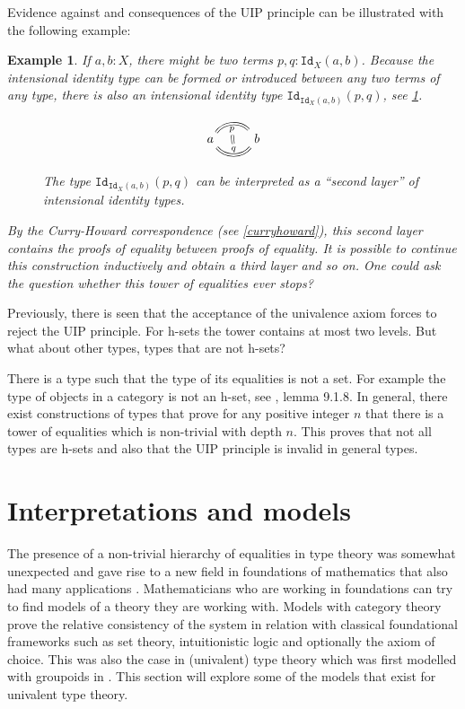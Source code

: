 \documentclass[12pt,a4paper,twoside,xetex]{book}
\newtheorem{example}[theorem]{Example}
\newcommand{\op}[1]{\mathtt{#1}}
\begin{document}
Evidence against and consequences of the UIP principle can be illustrated with 
the following example:

\begin{example}\label{stackedeqs}
If $a,b:X$, there might be two terms $p,q:\op{Id}_X(a,b)$. Because the 
intensional identity type can be formed or introduced between any two terms of 
any type, there is also an intensional identity type 
$\op{Id}_{\op{Id}_X(a,b)}(p,q)$, see \cref{secondleveleq}. 


\begin{figure}\label{secondleveleq}
 \centering
 
\[ \begin{tikzcd}
a \arrow[equal, r, bend left=50, "p"{name=U, below}]
\arrow[equal, r, bend right=50, "q"{name=D}]
& b
\arrow[equal, r, from=U, to=D]
\end{tikzcd}
\]
 \caption{The type $\op{Id}_{\op{Id}_X(a,b)}(p,q)$ can be interpreted as a 
``second layer'' of intensional identity types. }
\end{figure}


By the Curry-Howard correspondence (see \cref{curryhoward}), this second layer 
contains the proofs of equality between proofs of equality. It is possible to 
continue this construction inductively and obtain a third layer and so on. One 
could ask the question whether this tower of equalities ever stops? 
\end{example}




Previously, there is seen that the acceptance of the univalence axiom forces 
to reject the UIP principle. For h-sets the tower contains at most two levels. 
But what about other types, types that are not h-sets? 

There is a type such that the type of its equalities is not a set. For example 
the type of objects in a category is not an h-set, see \cite{Voevodsky2013}, 
lemma 9.1.8. In general, there exist constructions of types that prove for any 
positive integer $n$ that there is a tower of equalities which is non-trivial 
with depth $n$. This proves that not all types are h-sets and also that the UIP 
principle is invalid in general types. 



\chapter{Interpretations and models}

The presence of a non-trivial hierarchy of equalities in type theory was 
somewhat unexpected and gave rise to a new field in foundations of mathematics 
that also had many applications \cite{Voevodsky2013}. Mathematicians who are 
working in foundations can try to find models of a theory they are working 
with. Models with category theory prove the relative consistency of the system 
in relation with classical foundational frameworks such as set theory, 
intuitionistic logic and optionally the axiom of choice. This was also the case 
in (univalent) type theory which was first modelled with groupoids in 
\cite{Hofmann1998}. This section will explore some of the models that exist for 
univalent type theory.
\end{document}
